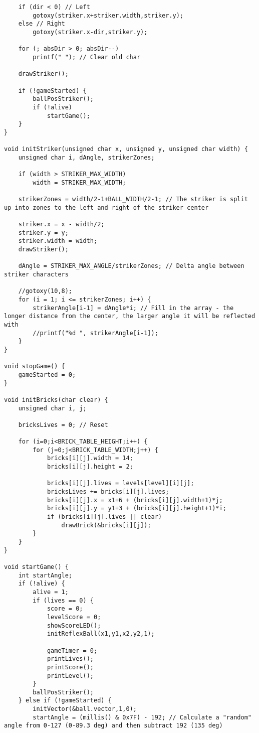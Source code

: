 \begin{lstlisting}
	if (dir < 0) // Left
		gotoxy(striker.x+striker.width,striker.y);
	else // Right
		gotoxy(striker.x-dir,striker.y);

	for (; absDir > 0; absDir--)
		printf(" "); // Clear old char

	drawStriker();

	if (!gameStarted) {
		ballPosStriker();
		if (!alive)
			startGame();
	}
}

void initStriker(unsigned char x, unsigned y, unsigned char width) {
	unsigned char i, dAngle, strikerZones;

	if (width > STRIKER_MAX_WIDTH)
		width = STRIKER_MAX_WIDTH;

	strikerZones = width/2-1+BALL_WIDTH/2-1; // The striker is split up into zones to the left and right of the striker center

	striker.x = x - width/2;
	striker.y = y;
	striker.width = width;
	drawStriker();

	dAngle = STRIKER_MAX_ANGLE/strikerZones; // Delta angle between striker characters

	//gotoxy(10,8);
	for (i = 1; i <= strikerZones; i++) {
		strikerAngle[i-1] = dAngle*i; // Fill in the array - the longer distance from the center, the larger angle it will be reflected with
		//printf("%d ", strikerAngle[i-1]);
	}
}

void stopGame() {
	gameStarted = 0;
}

void initBricks(char clear) {
	unsigned char i, j;

	bricksLives = 0; // Reset

	for (i=0;i<BRICK_TABLE_HEIGHT;i++) {
		for (j=0;j<BRICK_TABLE_WIDTH;j++) {
			bricks[i][j].width = 14;
			bricks[i][j].height = 2;

			bricks[i][j].lives = levels[level][i][j];
			bricksLives += bricks[i][j].lives;
			bricks[i][j].x = x1+6 + (bricks[i][j].width+1)*j;
			bricks[i][j].y = y1+3 + (bricks[i][j].height+1)*i;
			if (bricks[i][j].lives || clear)
				drawBrick(&bricks[i][j]);
		}
	}
}

void startGame() {
	int startAngle;
	if (!alive) {
		alive = 1;
		if (lives == 0) {						
			score = 0;
			levelScore = 0;
			showScoreLED();
			initReflexBall(x1,y1,x2,y2,1);

			gameTimer = 0;
			printLives();
			printScore();			
			printLevel();
		}
		ballPosStriker();		
	} else if (!gameStarted) {
		initVector(&ball.vector,1,0);
		startAngle = (millis() & 0x7F) - 192; // Calculate a "random" angle from 0-127 (0-89.3 deg) and then subtract 192 (135 deg)


\end{lstlisting}
